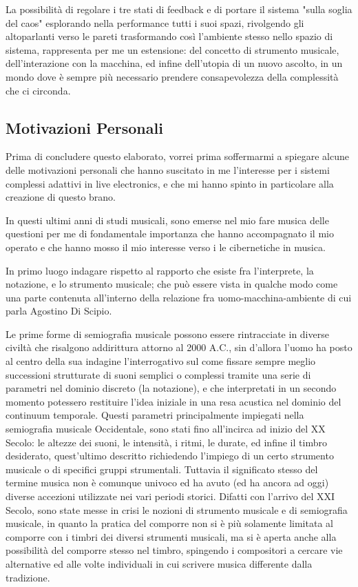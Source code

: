 La possibilità di regolare i tre stati di feedback e di portare il sistema "sulla soglia del caos"
esplorando nella performance tutti i suoi spazi, 
rivolgendo gli altoparlanti verso le pareti trasformando così l'ambiente stesso
nello spazio di sistema, rappresenta per me un estensione: del concetto di strumento musicale, 
dell'interazione con la macchina, ed infine dell'utopia di un nuovo ascolto,
in un mondo dove è sempre più necessario prendere consapevolezza della complessità che ci circonda.

\subsection{Motivazioni Personali}
\label{Motivazioni Personali}

Prima di concludere questo elaborato, 
vorrei prima soffermarmi a spiegare alcune delle motivazioni 
personali che hanno suscitato in me l'interesse per i 
sistemi complessi adattivi in live electronics, 
e che mi hanno spinto in particolare alla creazione di questo brano. 

In questi ultimi anni di studi musicali, sono emerse nel mio fare musica 
delle questioni per me di fondamentale importanza che hanno accompagnato il mio operato
e che hanno mosso il mio interesse verso i le cibernetiche in musica. 

In primo luogo indagare rispetto al rapporto che esiste fra l'interprete, la notazione, e lo strumento musicale;
che può essere vista in qualche modo come una parte contenuta all'interno 
della relazione fra uomo-macchina-ambiente di cui parla
Agostino Di Scipio. 

Le prime forme di semiografia musicale possono essere rintracciate in diverse civiltà 
che risalgono addirittura attorno al 2000 A.C.,
sin d'allora l'uomo ha posto al centro della sua indagine l'interrogativo sul come fissare sempre meglio 
successioni strutturate di suoni semplici o complessi tramite una serie di parametri nel dominio discreto (la notazione), 
e che interpretati in un secondo momento potessero restituire l'idea iniziale in una resa 
acustica nel dominio del continuum temporale.
Questi parametri principalmente impiegati nella semiografia musicale Occidentale, 
sono stati fino all'incirca ad inizio del XX Secolo: 
le altezze dei suoni, le intensità, i ritmi, le durate, ed infine il timbro desiderato, 
quest'ultimo descritto richiedendo l'impiego di un certo strumento musicale o di specifici gruppi strumentali.
Tuttavia il significato stesso del termine musica non è comunque univoco ed ha avuto (ed ha ancora ad oggi) 
diverse accezioni utilizzate nei vari periodi storici.
Difatti con l'arrivo del XXI Secolo, sono state messe in crisi le nozioni di strumento musicale e di semiografia musicale, 
in quanto la pratica del comporre non si è più solamente limitata al comporre 
con i timbri dei diversi strumenti musicali, ma si è aperta anche alla possibilità del comporre stesso nel timbro, 
spingendo i compositori a cercare vie alternative ed alle volte individuali in cui scrivere musica differente dalla tradizione.

